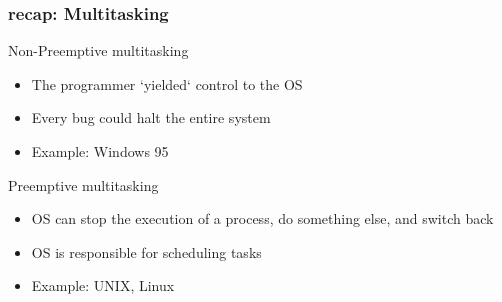 \begin{frame}[fragile]
	\frametitle{recap: Multitasking}
	{\color{red}Non-Preemptive multitasking}
	\begin{itemize}
		\item The programmer `yielded` control to the OS
		\item Every bug could halt the entire system
		\item Example: Windows 95
	\end{itemize}
	
	{\color{red}Preemptive multitasking}
	\begin{itemize}
		\item OS can stop the execution of a process, do something else, and switch back
		\item OS is responsible for scheduling tasks
		\item Example: UNIX, Linux
	\end{itemize}
\end{frame}

